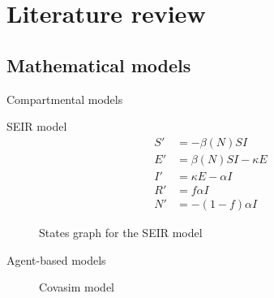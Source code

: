 \section{Literature review}

\subsection{Mathematical models}

\begin{frame}{Compartmental models}
    \begin{block}{\gls{SEIR} model \cite{brauerCompartmentalModelsEpidemiology2008}}
        \begin{equation*}
            \begin{aligned}
                S' &= - \beta(N)SI \\
                E' &= \beta(N)SI - \kappa E \\
                I' &= \kappa E - \alpha I \\
                R' &= f \alpha I \\
                N' &= - (1 - f) \alpha I
            \end{aligned}
        \end{equation*}
    \end{block}

    \begin{figure}
        \centering
        \caption{States graph for the \gls{SEIR} model}
        \label{fig:seir-model-transition-graph}
    \end{figure}
\end{frame}

\begin{frame}{Agent-based models}
    \begin{figure}[!htb]
        \centering
        \caption{Covasim model \cite{kerrCovasimAgentbasedModel2021}}
        \label{fig:covasim-schematics}
    \end{figure}
\end{frame}

